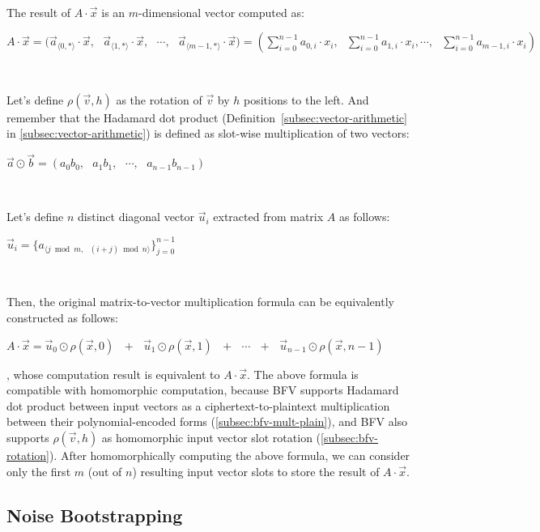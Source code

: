 $ $

The result of $A \cdot \vec{x}$ is an $m$-dimensional vector computed as:

$A \cdot \vec{x} = \Big(\vec{a}_{\langle 0, * \rangle} \cdot \vec{x}, \text{ } \vec{a}_{\langle 1, * \rangle} \cdot \vec{x}, \text{ }\cdots,\text{ } \vec{a}_{\langle m-1, * \rangle} \cdot \vec{x} \Big) = \left(\sum\limits_{i=0}^{n-1} a_{0, i} \cdot  x_i, \text{ } \sum\limits_{i=0}^{n-1}  a_{1, i} \cdot x_i, \cdots, \text{ } \sum\limits_{i=0}^{n-1} a_{m-1, i} \cdot x_i \right)$

$ $

Let's define $\rho(\vec{v}, h)$ as the rotation of $\vec{v}$ by $h$ positions to the left. And remember that the Hadamard dot product (Definition~\ref*{subsec:vector-arithmetic} in \autoref{subsec:vector-arithmetic}) is defined as slot-wise multiplication of two vectors: 

$\vec{a} \odot \vec{b} = (a_0 b_0, \text{ } a_1 b_1, \text{ } \cdots, \text{ } a_{n-1} b_{n-1})$

$ $

Let's define $n$ distinct diagonal vector $\vec{u}_i$ extracted from matrix $A$ as follows: 

$\vec{u}_i = \{a_{\langle j \bmod m, \text{ } (i + j)\bmod n \rangle}\}_{j = 0}^{n-1}$

$ $

Then, the original matrix-to-vector multiplication formula can be equivalently constructed as follows:

$A \cdot \vec{x} = \vec{u}_0 \odot \rho(\vec{x}, 0) \text{ } + \text{ } \vec{u}_1 \odot \rho(\vec{x}, 1) \text{ } + \text{ } \cdots \text{ } + \text{ } \vec{u}_{n-1} \odot \rho(\vec{x}, n-1)$

, whose computation result is equivalent to $A \cdot \vec{x}$. 
The above formula is compatible with homomorphic computation, because BFV supports Hadamard dot product between input vectors as a ciphertext-to-plaintext multiplication between their polynomial-encoded forms (\autoref{subsec:bfv-mult-plain}), and BFV also supports $\rho(\vec{v}, h)$ as homomorphic input vector slot rotation (\autoref{subsec:bfv-rotation}). After homomorphically computing the above formula, we can consider only the first $m$ (out of $n$) resulting input vector slots to store the result of $A \cdot \vec{x}$. 



\subsection{Noise Bootstrapping}
\label{subsec:bfv-bootstrapping}


